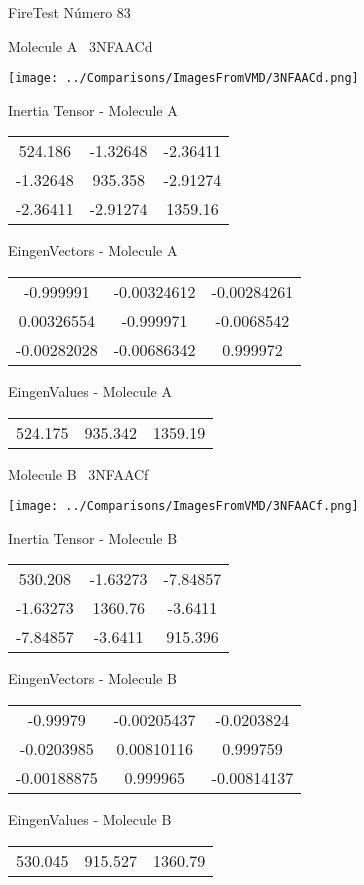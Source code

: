 \vtab[-3cm]
\begin{center}
{\large FireTest \tab Número 83}
\end{center}
\begin{multicols}{2}
\begin{center}

Molecule A \
3NFAACd

\texttt{[image: ../Comparisons/ImagesFromVMD/3NFAACd.png]}

Inertia Tensor - Molecule A \\
\begin{tabular}{|c c c|}
524.186	 & 	-1.32648	 & 	-2.36411	 \\
-1.32648	 & 	935.358	 & 	-2.91274	 \\
-2.36411	 & 	-2.91274	 & 	1359.16
\end{tabular}

\vtab
 EingenVectors - Molecule A     \\
\begin{tabular}{|c c c|}
-0.999991	 & 	-0.00324612	 & 	-0.00284261	 \\
0.00326554	 & 	-0.999971	 & 	-0.0068542	 \\
-0.00282028	 & 	-0.00686342	 & 	0.999972
\end{tabular}

\vtab
 EingenValues - Molecule A     \\
\begin{tabular}{|c c c|}
524.175	 & 	935.342	 & 	1359.19	 \\
\end{tabular}
\columnbreak

Molecule B \
3NFAACf

\texttt{[image: ../Comparisons/ImagesFromVMD/3NFAACf.png]}

Inertia Tensor - Molecule B \\
\begin{tabular}{|c c c|}
530.208	 & 	-1.63273	 & 	-7.84857	 \\
-1.63273	 & 	1360.76	 & 	-3.6411	 \\
-7.84857	 & 	-3.6411	 & 	915.396
\end{tabular}

\vtab
 EingenVectors - Molecule B     \\
\begin{tabular}{|c c c|}
-0.99979	 & 	-0.00205437	 & 	-0.0203824	 \\
-0.0203985	 & 	0.00810116	 & 	0.999759	 \\
-0.00188875	 & 	0.999965	 & 	-0.00814137
\end{tabular}

\vtab
 EingenValues - Molecule B     \\
\begin{tabular}{|c c c|}
530.045	 & 	915.527	 & 	1360.79	 \\
\end{tabular}

\end{center}
\end{multicols}

